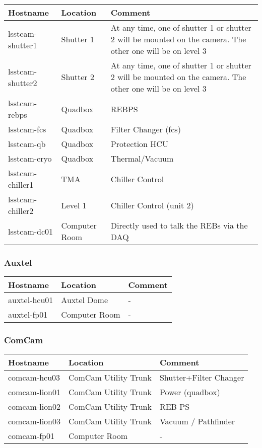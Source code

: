 \begin{tabular}{|p{5cm}|p{3cm}|p{5cm}| }
    \hline
    \rowcolor{lightgray}
    Hostname & Location & Comment \\
    \hline
    lsstcam-shutter1 & Shutter 1 & At any time, one of shutter 1 or shutter 2 will be mounted on the camera. The other one will be on level 3 \\
    \hline
    lsstcam-shutter2 & Shutter 2 & At any time, one of shutter 1 or shutter 2 will be mounted on the camera. The other one will be on level 3 \\
    \hline
    lsstcam-rebps & Quadbox & REBPS \\
    \hline
    lsstcam-fcs & Quadbox & Filter Changer (fcs) \\
    \hline
    lsstcam-qb & Quadbox & Protection HCU \\
    \hline
    lsstcam-cryo & Quadbox & Thermal/Vacuum \\
    \hline
    lsstcam-chiller1 & TMA & Chiller Control \\
    \hline
    lsstcam-chiller2 & Level 1 & Chiller Control (unit 2) \\
    \hline
    lsstcam-dc01 & Computer Room & Directly used to talk the REBs via the DAQ \\
    \hline
\end{tabular}

\subsubsection{Auxtel}

\begin{tabular}{|p{5cm}|p{3cm}|p{5cm}| }
    \hline
    \rowcolor{lightgray}
    Hostname & Location & Comment \\
    \hline
    auxtel-hcu01 & Auxtel Dome & - \\
    \hline
    auxtel-fp01 & Computer Room & - \\
    \hline
\end{tabular}

\subsubsection{ComCam}

\begin{tabular}{|p{5cm}|p{3cm}|p{5cm}| }
    \hline
    \rowcolor{lightgray}
    Hostname & Location & Comment \\
    \hline
    comcam-hcu03 & ComCam Utility Trunk & Shutter+Filter Changer \\
    \hline
    comcam-lion01 & ComCam Utility Trunk & Power (quadbox) \\
    \hline
    comcam-lion02 & ComCam Utility Trunk & REB PS \\
    \hline
    comcam-lion03 & ComCam Utility Trunk & Vacuum / Pathfinder \\
    \hline
    comcam-fp01 & Computer Room & - \\
    \hline
\end{tabular}

